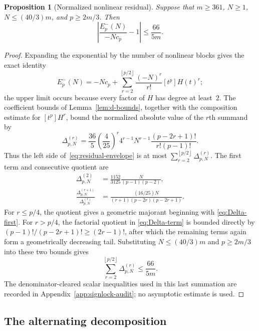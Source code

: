 \documentclass[11pt]{article}
\newtheorem{proposition}[theorem]{Proposition}
\theoremstyle{definition}
\theoremstyle{remark}
\newcommand{\floor}[1]{\left\lfloor #1\right\rfloor}
\begin{document}
\begin{proposition}[Normalized nonlinear residual]\label{prop:residual-envelope}
Suppose that $m\ge361$, $N\ge1$, $N\le(40/3)m$, and $p\ge2m/3$.  Then
\begin{equation}\label{eq:residual-envelope}
  \left|\frac{E^-_p(N)}{-Nc_p}-1\right|\le\frac{66}{5m}.
\end{equation}
\end{proposition}

\begin{proof}
Expanding the exponential by the number of nonlinear blocks gives the exact
identity
\begin{equation}\label{eq:Eminus-block-expansion}
 E^-_p(N)=-Nc_p+
   \sum_{r=2}^{\floor{p/2}}\frac{(-N)^r}{r!}[t^p]H(t)^r;
\end{equation}
the upper limit occurs because every factor of $H$ has degree at least~$2$.
The coefficient bounds of Lemma~\ref{lem:d-bounds}, together with the
composition estimate for $[t^p]H^r$, bound the normalized absolute value of the
$r$th summand by
\begin{equation}\label{eq:Delta-term}
 \Delta_{p,N}^{(r)}=
 \frac{36}{5}\left(\frac4{25}\right)^r4^{r-1}N^{r-1}
 \frac{(p-2r+1)!}{r!(p-1)!}.
\end{equation}
Thus the left side of~\eqref{eq:residual-envelope} is at most
$\sum_{r=2}^{\floor{p/2}}\Delta_{p,N}^{(r)}$.  The first term and consecutive
quotient are
\begin{align}
 \Delta_{p,N}^{(2)}
   &=\frac{1152}{3125}\frac{N}{(p-1)(p-2)},
 \label{eq:Delta-first}\\
 \frac{\Delta_{p,N}^{(r+1)}}{\Delta_{p,N}^{(r)}}
   &=\frac{(16/25)N}
   {(r+1)(p-2r)(p-2r+1)}.
 \label{eq:Delta-ratio}
\end{align}
For $r\le p/4$, the quotient gives a geometric majorant beginning with
\eqref{eq:Delta-first}.  For $r>p/4$, the factorial quotient in
\eqref{eq:Delta-term} is bounded directly by
$(p-1)!/(p-2r+1)!\ge(2r-1)!$, after which the remaining terms again form a
geometrically decreasing tail.  Substituting $N\le(40/3)m$ and
$p\ge2m/3$ into these two bounds gives
\[
  \sum_{r=2}^{\floor{p/2}}\Delta_{p,N}^{(r)}
  \le\frac{66}{5m}.
\]
The denominator-cleared scalar inequalities used in this last summation are
recorded in Appendix~\ref{app:signlock-audit}; no asymptotic estimate is used.
\end{proof}

\subsection{The alternating decomposition}
\end{document}

